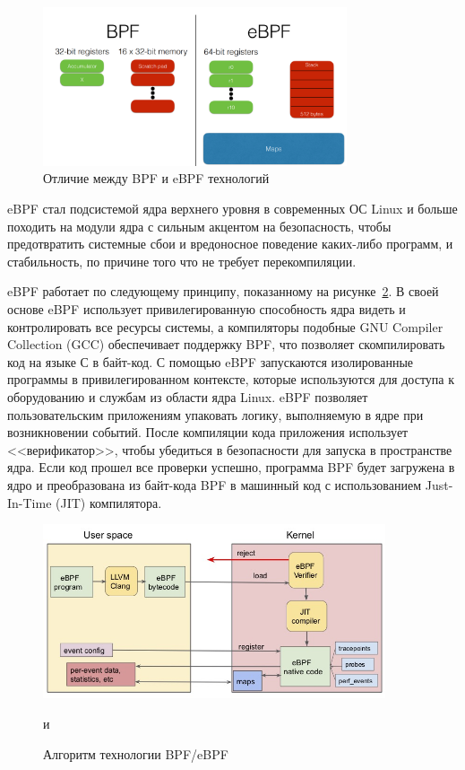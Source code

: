 \begin{figure}[h!]
	\centering
	\includegraphics[width=0.8\textwidth]{img/bpf_as_ebpf} %
	\caption{Отличие между BPF и eBPF технологий}
	\label{img:ebpf}
\end{figure}

eBPF стал подсистемой ядра верхнего уровня в современных ОС Linux и больше походить на модули ядра с сильным акцентом на безопасность, чтобы предотвратить системные сбои и вредоносное поведение каких-либо программ, и стабильность, по причине того что не требует перекомпиляции.

eBPF работает по следующему принципу, показанному на рисунке~\ref{img:arch_bpf}.
В своей основе eBPF использует привилегированную способность ядра видеть и контролировать все ресурсы системы, а компиляторы подобные GNU Compiler Collection (GCC) обеспечивает поддержку BPF, что позволяет скомпилировать код на языке С в байт-код.
С помощью eBPF запускаются изолированные программы в привилегированном контексте, которые используются для доступа к оборудованию и службам из области ядра Linux. 
eBPF позволяет пользовательским приложениям упаковать логику, выполняемую в ядре при возникновении событий.
После компиляции кода приложения использует <<верификатор>>, чтобы убедиться в безопасности для запуска в пространстве ядра. Если код прошел все проверки успешно, программа BPF будет загружена в ядро и преобразована из байт-кода BPF в машинный код с использованием Just-In-Time (JIT) компилятора. 

\begin{figure}[h!]
	\centering
	\includegraphics[width=0.9\textwidth]{img/arch_bpf_d}
	\caption{Алгоритм технологии BPF/eBPF}
	\label{img:arch_bpf}
и\end{figure}

